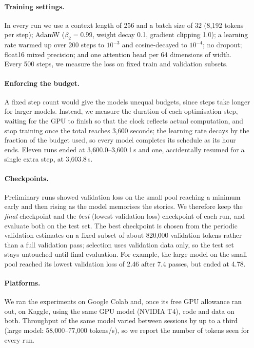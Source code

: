\documentclass[12pt]{article}
\begin{document}
\paragraph{Training settings.} In every run we use a context length of 256 and a batch size of 32 (8,192 tokens per step); AdamW ($\beta_2=0.99$, weight decay 0.1, gradient clipping 1.0); a learning rate warmed up over 200 steps to $10^{-3}$ and cosine-decayed to $10^{-4}$; no dropout; float16 mixed precision; and one attention head per 64 dimensions of width. Every 500 steps, we measure the loss on fixed train and validation subsets.
 
\paragraph{Enforcing the budget.} A fixed step count would give the models unequal budgets, since steps take longer for larger models. Instead, we measure the duration of each optimisation step, waiting for the GPU to finish so that the clock reflects actual computation, and stop training once the total reaches 3,600 seconds; the learning rate decays by the fraction of the budget used, so every model completes its schedule as its hour ends. Eleven runs ended at 3,600.0--3,600.1\,s and one, accidentally resumed for a single extra step, at 3,603.8\,s.

 \paragraph{Checkpoints.} Preliminary runs showed validation loss on the small pool reaching a minimum early and then rising as the model memorises the stories. We therefore keep the \emph{final} checkpoint and the \emph{best} (lowest validation loss) checkpoint of each run, and evaluate both on the test set. The best checkpoint is chosen from the periodic validation estimates on a fixed subset of about 820,000 validation tokens rather than a full validation pass; selection uses validation data only, so the test set stays untouched until final evaluation. For example, the large model on the small pool reached its lowest validation loss of 2.46 after 7.4 passes, but ended at 4.78.
 
\paragraph{Platforms.} We ran the experiments on Google Colab and, once its free GPU allowance ran out, on Kaggle, using the same GPU model (NVIDIA T4), code and data on both. Throughput of the same model varied between sessions by up to a third (large model: 58,000--77,000 tokens/s), so we report the number of tokens seen for every run.
\end{document}
